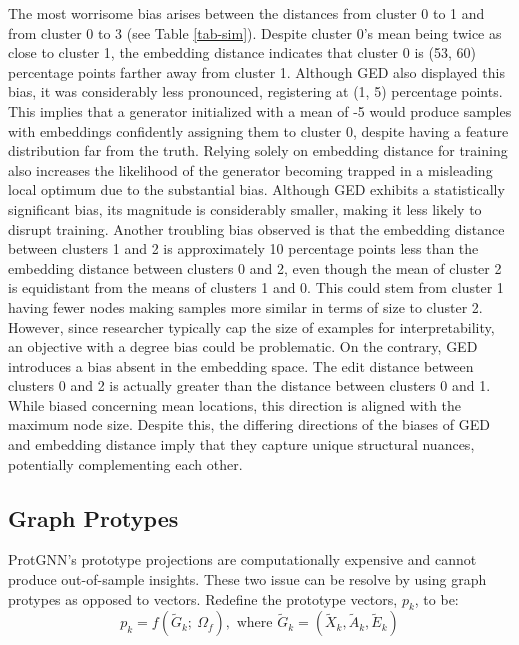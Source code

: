 \documentclass[
  11pt,
  letterpaper,
]{article}
\begin{document}
\quad The most worrisome bias arises between the distances from cluster
0 to 1 and from cluster 0 to 3 (see Table \ref{tab-sim}). Despite
cluster 0's mean being twice as close to cluster 1, the embedding
distance indicates that cluster 0 is (53, 60) percentage points farther
away from cluster 1. Although GED also displayed this bias, it was
considerably less pronounced, registering at (1, 5) percentage points.
This implies that a generator initialized with a mean of -5 would
produce samples with embeddings confidently assigning them to cluster 0,
despite having a feature distribution far from the truth. Relying solely
on embedding distance for training also increases the likelihood of the
generator becoming trapped in a misleading local optimum due to the
substantial bias. Although GED exhibits a statistically significant
bias, its magnitude is considerably smaller, making it less likely to
disrupt training. Another troubling bias observed is that the embedding
distance between clusters 1 and 2 is approximately 10 percentage points
less than the embedding distance between clusters 0 and 2, even though
the mean of cluster 2 is equidistant from the means of clusters 1 and 0.
This could stem from cluster 1 having fewer nodes making samples more
similar in terms of size to cluster 2. However, since researcher
typically cap the size of examples for interpretability, an objective
with a degree bias could be problematic. On the contrary, GED introduces
a bias absent in the embedding space. The edit distance between clusters
0 and 2 is actually greater than the distance between clusters 0 and 1.
While biased concerning mean locations, this direction is aligned with
the maximum node size. Despite this, the differing directions of the
biases of GED and embedding distance imply that they capture unique
structural nuances, potentially complementing each other.

\hypertarget{graph-protypes}{%
\subsection{Graph Protypes}\label{graph-protypes}}

\quad ProtGNN's prototype projections are computationally expensive and
cannot produce out-of-sample insights. These two issue can be resolve by
using graph protypes as opposed to vectors. Redefine the prototype
vectors, \(p_k\), to be: \begin{equation}
    p_k = f(\tilde{G}_k; \ \Omega_f), \text{ where } \tilde{G}_k = (\tilde{X}_k, \tilde{A}_k, \tilde{E}_k)
\end{equation}
\end{document}
